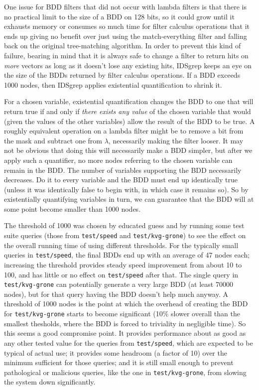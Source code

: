 \documentclass[twocolumn]{report}
\begin{document}
One issue for BDD filters that did not occur with lambda filters is that
there is no practical limit to the size of a BDD on 128 bits, so it could
grow until it exhausts memory or consumes so much time for filter calculus
operations that it ends up giving no benefit over just using the
match-everything filter and falling back on the original tree-matching
algorithm.  In order to prevent this kind of failure, bearing in mind that
it is always safe to change a filter to return hits on \emph{more} vectors as
long as it doesn't lose any existing hits, IDSgrep keeps an eye on the size
of the BDDs returned by filter calculus operations.  If a BDD exceeds 1000
nodes, then IDSgrep applies existential quantification to shrink it.

For a chosen variable, existential quantification changes the BDD to one
that will return true if and only if \emph{there exists any value} of the
chosen variable that would (given the values of the other variables) allow
the result of the BDD to be true.  A roughly equivalent operation on a
lambda filter might be to remove a bit from the mask and subtract one from
$\lambda$, necessarily making the filter looser.  It may not be obvious that
doing this will necessarily make a BDD simpler, but after we apply such a
quantifier, no more nodes referring to the chosen variable can remain in the
BDD.  The number of variables supporting the BDD necessarily decreases.  Do
it to every variable and the BDD must end up identically true (unless it was
identically false to begin with, in which case it remains so).  So by
existentially quantifying variables in turn, we can guarantee that the BDD
will at some point become smaller than 1000 nodes.

The threshold of 1000 was chosen by educated guess and by running some test
suite queries (those from \texttt{test/speed} and \texttt{test/kvg-grone})
to see the effect on the overall running time of using different thresholds. 
For the typically small queries in \texttt{test/speed}, the final BDDs end
up with an average of 47 nodes each; increasing the threshold provides
steady speed improvement from about 10 to 100, and has little or no effect
on \texttt{test/speed} after that.  The single query in
\texttt{test/kvg-grone} can potentially generate a very large BDD (at least
70000 nodes), but for that query having the BDD doesn't help much anyway.  A
threshold of 1000 nodes is the point at which the overhead of creating the
BDD for \texttt{test/kvg-grone} starts to become significant (10\% slower
overall than the smallest thesholds, where the BDD is forced to triviality
in negligible time).  So this seems a good compromise point.  It provides
performance about as good as any other tested value for the queries from
\texttt{test/speed}, which are expected to be typical of actual use; it
provides some headroom (a factor of 10) over the minimum sufficient for
those queries; and it is still small enough to prevent pathological or
malicious queries, like the one in \texttt{test/kvg-grone}, from slowing the
system down significantly.
\end{document}
